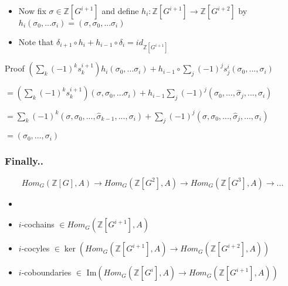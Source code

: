 \documentclass[10pt,xcolor=table,dvipsnames]{beamer}
\newenvironment{stepitemize}{\begin{itemize}[<+->]}{\end{itemize} }
\begin{document}
\begin{frame}
\begin{itemize}
\item  Now fix $\sigma \in \mathbb{Z}\left[ G^{i+1}\right] $ and define $h_{i}:%
\mathbb{Z}\left[ G^{i+1}\right] \longrightarrow \mathbb{Z}\left[ G^{i+2}%
\right] $ by $h_{i}\left( \sigma _{0},...\sigma _{i}\right) =\left( \sigma
,\sigma _{0},...\sigma _{i}\right) $
\item Note that $\delta _{i+1}\circ h_{i}+h_{i-1}\circ \delta _{i}=id_{\mathbb{Z}\left[
G^{i+1}\right] }$
\end{itemize}
\begin{block}{Proof}
$\left( \sum\limits_{k}\left( -1\right) ^{k}s_{k}^{i+1}\right) h_{i}\left(
\sigma _{0},...\sigma _{i}\right) +h_{i-1}\circ \sum\limits_{j}\left(
-1\right) ^{j}s_{j}^{i}\left( \sigma _{0},...,\sigma _{i}\right) $

$=\left( \sum\limits_{k}\left( -1\right) ^{k}s_{k}^{i+1}\right) \left(
\sigma ,\sigma _{0},...\sigma _{i}\right) +h_{i-1}\sum\limits_{j}\left(
-1\right) ^{j}\left( \sigma _{0},...,\widehat{\sigma }_{j},...,\sigma
_{i}\right) $

$=\sum\limits_{k}\left( -1\right) ^{k}\left( \sigma ,\sigma _{0},...,%
\widehat{\sigma }_{k-1},...,\sigma _{i}\right) +\sum\limits_{j}\left(
-1\right) ^{j}\left( \sigma ,\sigma _{0},...,\widehat{\sigma }%
_{j},...,\sigma _{i}\right) $

$=\left( \sigma _{0},...,\sigma _{i}\right) $

        \end{block}
\end{frame}

\begin{frame}
\frametitle{Finally..}
\begin{equation*}
Hom_{G}\left( \mathbb{Z}\left[ G\right] ,A\right) \longrightarrow
Hom_{G}\left( \mathbb{Z}\left[ G^{2}\right] ,A\right) \longrightarrow
Hom_{G}\left( \mathbb{Z}\left[ G^{3}\right] ,A\right) \longrightarrow ...
\end{equation*}

\begin{stepitemize}
\item[]
\item[] $i$-cochains $\in Hom_{G}\left( \mathbb{Z}\left[ G^{i+1}\right] ,A\right) $

\item[] $i$-cocyles $\in \ker \left( Hom_{G}\left( \mathbb{Z}\left[ G^{i+1}\right]
,A\right) \longrightarrow Hom_{G}\left( \mathbb{Z}\left[ G^{i+2}\right]
,A\right) \right) $
\item[] $i$-coboundaries $\in $ $\text{Im}\left(
Hom_{G}\left( \mathbb{Z}\left[ G^{i}\right] ,A\right) \longrightarrow
Hom_{G}\left( \mathbb{Z}\left[ G^{i+1}\right] ,A\right) \right) $
\end{stepitemize}
\end{frame}
\end{document}
